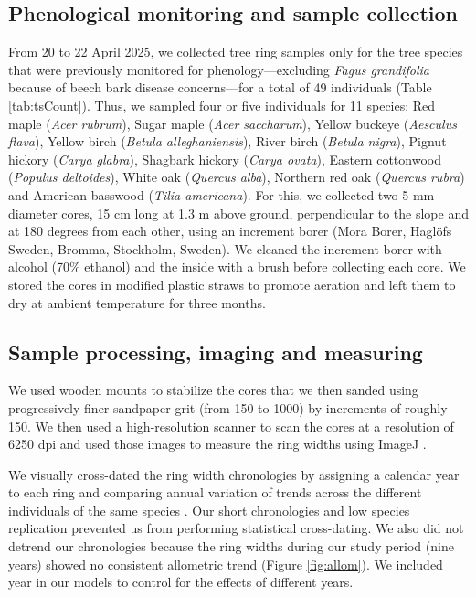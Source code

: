 \documentclass{article}\usepackage[]{graphicx}\usepackage[]{xcolor}
\begin{document}
\subsection{Phenological monitoring and sample collection}
From 20 to 22 April 2025, we collected tree ring samples only for the tree species that were previously monitored for phenology---excluding \textit{Fagus grandifolia} because of beech bark disease concerns---for a total of 49 individuals (Table \ref{tab:tsCount}).  Thus, we sampled four or five individuals for 11 species: Red maple (\textit{Acer rubrum}), Sugar maple (\textit{Acer saccharum}), Yellow buckeye (\textit{Aesculus flava}), Yellow birch (\textit{Betula alleghaniensis}), River birch (\textit{Betula nigra}), Pignut hickory (\textit{Carya glabra}), Shagbark hickory (\textit{Carya ovata}), Eastern cottonwood (\textit{Populus deltoides}), White oak (\textit{Quercus alba}), Northern red oak (\textit{Quercus rubra}) and American basswood (\textit{Tilia americana}). For this, we collected two 5-mm diameter cores, 15 cm long at 1.3 m above ground, perpendicular to the slope and at 180 degrees from each other, using an increment borer (Mora Borer, Haglöfs Sweden, Bromma, Stockholm, Sweden). We cleaned the increment borer with alcohol (70\% ethanol) and the inside with a brush before collecting each core. We stored the cores in modified plastic straws to promote aeration and left them to dry at ambient temperature for three months.

\subsection{Sample processing, imaging and measuring}
We used wooden mounts to stabilize the cores that we then sanded using progressively finer sandpaper grit (from 150 to 1000) by increments of roughly 150. We then used a high-resolution scanner to scan the cores at a resolution of 6250 dpi \citep{fong_tim_2026} and used those images to measure the ring widths using ImageJ \citep{schneider_nih_2012}. 

We visually cross-dated the ring width chronologies by assigning a calendar year to each ring and comparing annual variation of trends across the different individuals of the same species \citep{cook_methods_1990}. Our short chronologies and low species replication prevented us from performing statistical cross-dating. We also did not detrend our chronologies because the ring widths during our study period (nine years) showed no consistent allometric trend (Figure \ref{fig:allom}). We included year in our models to control for the effects of different years.
\end{document}
